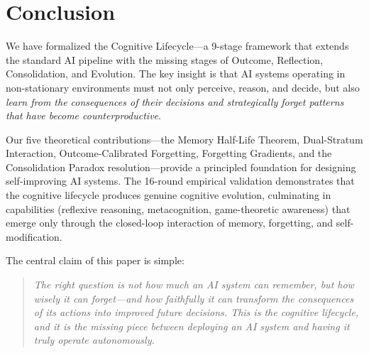 \documentclass[11pt, a4paper]{article}
\begin{document}
\section{Conclusion}

We have formalized the Cognitive Lifecycle---a 9-stage framework that extends the standard AI pipeline with the missing stages of Outcome, Reflection, Consolidation, and Evolution. The key insight is that AI systems operating in non-stationary environments must not only perceive, reason, and decide, but also \emph{learn from the consequences of their decisions and strategically forget patterns that have become counterproductive}.

Our five theoretical contributions---the Memory Half-Life Theorem, Dual-Stratum Interaction, Outcome-Calibrated Forgetting, Forgetting Gradients, and the Consolidation Paradox resolution---provide a principled foundation for designing self-improving AI systems. The 16-round empirical validation demonstrates that the cognitive lifecycle produces genuine cognitive evolution, culminating in capabilities (reflexive reasoning, metacognition, game-theoretic awareness) that emerge only through the closed-loop interaction of memory, forgetting, and self-modification.

The central claim of this paper is simple:

\begin{quote}
\emph{The right question is not how much an AI system can remember, but how wisely it can forget---and how faithfully it can transform the consequences of its actions into improved future decisions. This is the cognitive lifecycle, and it is the missing piece between deploying an AI system and having it truly operate autonomously.}
\end{quote}
\end{document}
